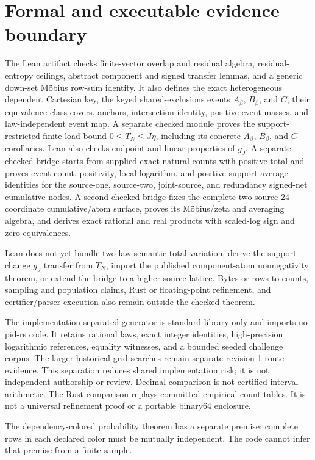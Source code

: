 \documentclass[11pt]{article}
\theoremstyle{definition}
\begin{document}
\section{Formal and executable evidence boundary}

The Lean artifact checks finite-vector overlap and residual algebra, residual-entropy ceilings,
abstract component and signed transfer lemmas, and a generic down-set M{\"o}bius row-sum identity.
It also defines the exact heterogeneous dependent Cartesian key, the keyed
shared-exclusions events \(A_\beta\), \(B_\beta\), and \(C\), their equivalence-class covers,
anchors, intersection identity, positive event masses, and law-independent event map.  A separate
checked module proves the support-restricted finite load bound \(0\leq T_N\leq J\eta\), including
its concrete \(A_\beta\), \(B_\beta\), and \(C\) corollaries.  Lean also checks endpoint and linear
properties of \(g_J\).  A separate checked bridge starts from supplied exact natural counts with
positive total and proves event-count, positivity, local-logarithm, and positive-support average
identities for the source-one, source-two, joint-source, and redundancy signed-net cumulative
nodes.  A second checked bridge fixes the complete two-source 24-coordinate cumulative/atom
surface, proves its M{\"o}bius/zeta and averaging algebra, and derives exact rational and real
products with scaled-log sign and zero equivalences.

Lean does not yet bundle two-law semantic total variation, derive the support-change \(g_J\)
transfer from \(T_N\), import the published component-atom nonnegativity theorem, or extend the
bridge to a higher-source lattice.  Bytes or rows to counts, sampling and population claims, Rust
or floating-point refinement, and certifier/parser execution also remain outside the checked
theorem.

The implementation-separated generator is standard-library-only and imports no pid-rs code.  It
retains rational laws, exact integer identities, high-precision logarithmic references, equality
witnesses, and a bounded seeded challenge corpus.  The larger historical grid searches remain
separate revision-1 route evidence.  This separation reduces shared implementation risk; it is not
independent authorship or review.  Decimal comparison is not certified interval arithmetic.  The
Rust comparison replays committed empirical count tables.  It is not a universal refinement proof
or a portable binary64 enclosure.

The dependency-colored probability theorem has a separate premise: complete rows in each declared
color must be mutually independent.  The code cannot infer that premise from a finite sample.
\end{document}
